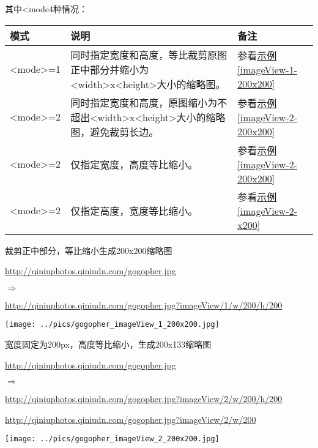 \documentclass[11pt, oneside]{book}
\newcommand{\qpar}[1]{
\vspace{0.25em}
\noindent
#1\par
\vspace{0.25em}
}
\newcommand{\qurl}[1]{\url{#1}}
\newcommand{\qtable}[1]{\footnotesize\vspace{0.5em}#1\vspace{0.5em}\normalsize}
\begin{document}
\begin{CJK*}{UTF8}{song}
\qpar{其中\textless mode4种情况：}
\qtable{
\def\arraystretch{2}
\begin{tabular}{|l|p{22em}|l|}
\hline
模式 & 说明 & 备注 \\
\hline
\textless mode\textgreater=1 & 同时指定宽度和高度，等比裁剪原图正中部分并缩小为\textless width\textgreater x\textless height\textgreater 大小的缩略图。& 参看\hyperref[imageView-1-200x200]{示例\ref*{imageView-1-200x200}} \\
\hline
\textless mode\textgreater=2 & 同时指定宽度和高度，原图缩小为不超出\textless width\textgreater x\textless height\textgreater 大小的缩略图，避免裁剪长边。& 参看\hyperref[imageView-2-200x200]{示例\ref*{imageView-2-200x200}} \\
\hline
\textless mode\textgreater=2 & 仅指定宽度，高度等比缩小。 & 参看\hyperref[imageView-2-200x200]{示例\ref*{imageView-2-200x200}} \\
\hline
\textless mode\textgreater=2 & 仅指定高度，宽度等比缩小。 & 参看\hyperref[imageView-2-x200]{示例\ref*{imageView-2-x200}} \\
\hline
\end{tabular}
}

\clearpage

\begin{sample}
  \caption{裁剪正中部分，等比缩小生成200x200缩略图}
    \qpar{\qurl{http://qiniuphotos.qiniudn.com/gogopher.jpg}}
    \qpar{$\Rightarrow$}
    \qpar{\qurl{http://qiniuphotos.qiniudn.com/gogopher.jpg?imageView/1/w/200/h/200}}

    \begin{center}
      \texttt{[image: ../pics/gogopher\_imageView\_1\_200x200.jpg]}
    \end{center}
  \label{imageView-1-200x200}
\end{sample}

\begin{sample}
  \caption{宽度固定为200px，高度等比缩小，生成200x133缩略图}
    \qpar{\qurl{http://qiniuphotos.qiniudn.com/gogopher.jpg}}
    \qpar{$\Rightarrow$}
    \qpar{\qurl{http://qiniuphotos.qiniudn.com/gogopher.jpg?imageView/2/w/200/h/200}}
    \qpar{\qurl{http://qiniuphotos.qiniudn.com/gogopher.jpg?imageView/2/w/200}}

    \begin{center}
      \texttt{[image: ../pics/gogopher\_imageView\_2\_200x200.jpg]}
    \end{center}
  \label{imageView-2-200x200}
\end{sample}


\end{CJK*}
\end{document}
